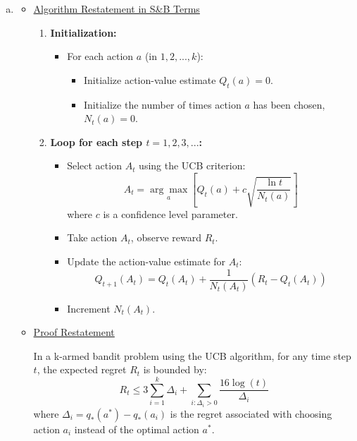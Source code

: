 \documentclass{article}
\begin{document}
\begin{enumerate}[a)]
    \item  
    \begin{itemize}
        \item \underline{Algorithm Restatement in S\&B Terms}\par 
        \begin{enumerate}
            \item \textbf{Initialization:}
            \begin{itemize}
                \item For each action \( a \) (in \( 1, 2, ..., k \)):
                \begin{itemize}
                    \item Initialize action-value estimate \( Q_t(a) = 0 \).
                    \item Initialize the number of times action \( a \) has been chosen, \( N_t(a) = 0 \).
                \end{itemize}
            \end{itemize}
        
            \item \textbf{Loop for each step \( t = 1, 2, 3, ... \):}
            \begin{itemize}
                \item Select action \( A_t \) using the UCB criterion:
                \[ A_t = \underset{a}{\arg\max} \left[ Q_t(a) + c \sqrt{\frac{\ln t}{N_t(a)}} \right] \]
                where \( c \) is a confidence level parameter.
                
                \item Take action \( A_t \), observe reward \( R_t \).
                
                \item Update the action-value estimate for \( A_t \):
                \[ Q_{t+1}(A_t) = Q_t(A_t) + \frac{1}{N_t(A_t)} (R_t - Q_t(A_t)) \]
                
                \item Increment \( N_t(A_t) \).
            \end{itemize}
        \end{enumerate}

        \item \underline{Proof Restatement}\par 
        In a k-armed bandit problem using the UCB algorithm, for any time step \( t \), the expected regret \( R_t \) is bounded by:
\[ R_t \leq 3 \sum_{i=1}^{k} \Delta_i + \sum_{i: \Delta_i > 0} \frac{16 \log(t)}{\Delta_i} \]
where \( \Delta_i = q_*(a^*) - q_*(a_i) \) is the regret associated with choosing action \( a_i \) instead of the optimal action \( a^* \).



\end{itemize}
\end{enumerate}
\end{document}
